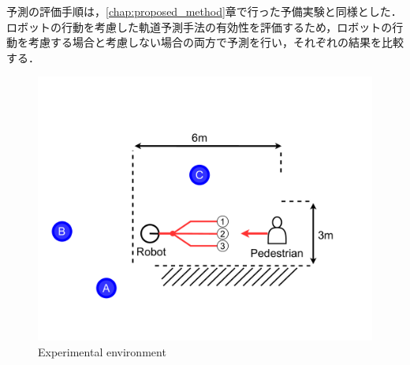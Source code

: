 予測の評価手順は，\ref{chap:proposed_method}章で行った予備実験と同様とした．ロボットの行動を考慮した軌道予測手法の有効性を評価するため，ロボットの行動を考慮する場合と考慮しない場合の両方で予測を行い，それぞれの結果を比較する．

\begin{figure}[H]
  \centering
 \includegraphics[keepaspectratio, scale=0.27]
      {images/oculus_experiments.pdf}
\caption{Experimental environment}
 \label{Fig:oculus-exp-overview}
\end{figure} 

